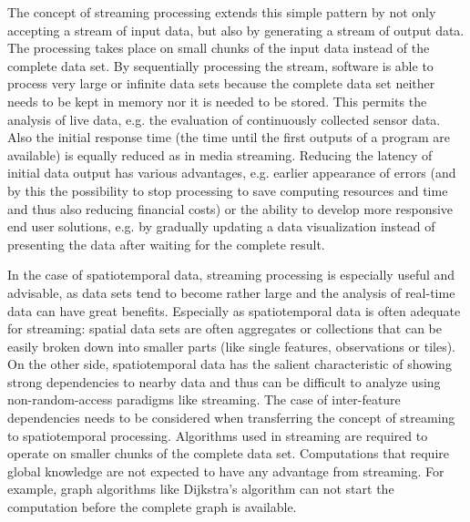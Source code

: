 The concept of streaming processing extends this simple pattern by not only accepting a stream of input data, but also by generating a stream of output data. The processing takes place on small chunks of the input data instead of the complete data set. By sequentially processing the stream, software is able to process very large or infinite data sets because the complete data set neither needs to be kept in memory nor it is needed to be stored. This permits the analysis of live data, e.g. the evaluation of continuously collected sensor data. Also the initial response time (the time until the first outputs of a program are available) is equally reduced as in media streaming. Reducing the latency of initial data output has various advantages, e.g. earlier appearance of errors (and by this the possibility to stop processing to save computing resources and time and thus also reducing financial costs) or the ability to develop more responsive end user solutions, e.g. by gradually updating a data visualization instead of presenting the data after waiting for the complete result.

In the case of spatiotemporal data, streaming processing is especially useful and advisable, as data sets tend to become rather large and the analysis of real-time data can have great benefits. Especially as spatiotemporal data is often adequate for streaming: spatial data sets are often aggregates or collections that can be easily broken down into smaller parts (like single features, observations or tiles). On the other side, spatiotemporal data has the salient characteristic of showing strong dependencies to nearby data and thus can be difficult to analyze using non-random-access paradigms like streaming. The case of inter-feature dependencies needs to be considered when transferring the concept of streaming to spatiotemporal processing. Algorithms used in streaming are required to operate on smaller chunks of the complete data set. Computations that require global knowledge are not expected to have any advantage from streaming. For example, graph algorithms like Dijkstra's algorithm \citep{dijkstra} can not start the computation before the complete graph is available.

